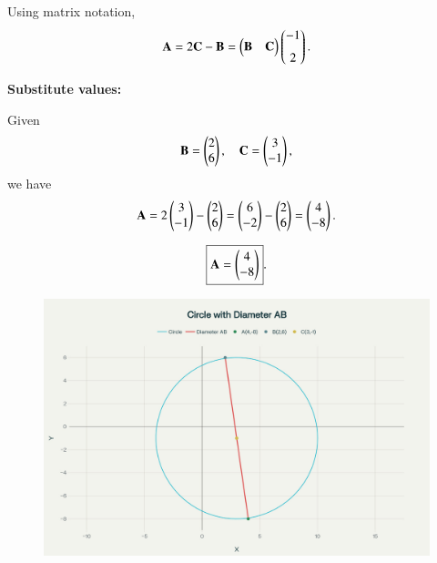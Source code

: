 \documentclass[journal]{IEEEtran}
\begin{document}
Using matrix notation,
\[
\mathbf{A} = 2 \mathbf{C} - \mathbf{B} 
= \begin{pmatrix} \mathbf{B} & \mathbf{C} \end{pmatrix}
\begin{pmatrix}-1 \\[6pt] 2\end{pmatrix}.
\]

\bigskip

\textbf{Substitute values:}

Given
\[
\mathbf{B} = \begin{pmatrix}2 \\ 6\end{pmatrix}, \quad \mathbf{C} = \begin{pmatrix}3 \\ -1\end{pmatrix},
\]
we have
\[
\mathbf{A} = 2 \begin{pmatrix}3 \\ -1\end{pmatrix} - \begin{pmatrix}2 \\ 6\end{pmatrix} = \begin{pmatrix}6 \\ -2\end{pmatrix} - \begin{pmatrix}2 \\ 6\end{pmatrix} = \begin{pmatrix}4 \\ -8\end{pmatrix}.
\]

\bigskip

\[
\boxed{\mathbf{A} = \begin{pmatrix}4 \\ -8\end{pmatrix}}.
\]



\begin{figure}[H]
    \centering
    \includegraphics[width=0.5\linewidth]{figs/fig.png}
    \caption{}
    \label{fig:placeholder}
\end{figure}
\end{document}
